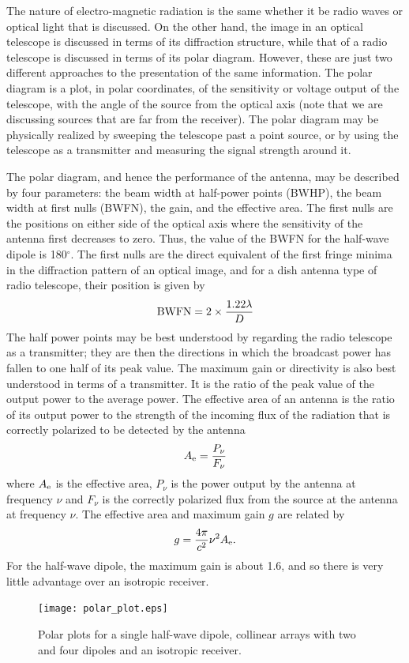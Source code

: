 The nature of electro-magnetic radiation is the same whether it be radio waves
or optical light that is discussed. On the other hand, the image in an optical 
telescope is discussed in terms of its diffraction structure, while that of 
a radio telescope is discussed in terms of its polar diagram. However, these 
are just two different approaches to the presentation of the same information.
The polar diagram is a plot, in polar coordinates, of the sensitivity or 
voltage output of the telescope, with the angle of the source from the
optical axis (note that we are discussing sources that are far from the 
receiver). The polar diagram may be physically realized by sweeping the 
telescope past a point source, or by using the telescope as a transmitter
and measuring the signal strength around it.

The polar diagram, and hence the performance of the antenna, may be described
by four parameters: the beam width at half-power points (BWHP), the 
beam width at first nulls (BWFN), the gain, and the effective area. The first
nulls are the positions on either side of the optical axis where the 
sensitivity of the antenna first decreases to zero. Thus, the value of the 
BWFN for the half-wave dipole is 180$^{\circ}$. The first nulls are the direct 
equivalent of the first fringe minima in the diffraction pattern of an optical
image, and for a dish antenna type of radio telescope, their position is given
by 
\[
{\rm BWFN}=2\times{1.22\lambda\over D}
\]
The half power points may be best understood by regarding the radio telescope
as a transmitter; they are then the directions in which the broadcast power
has fallen to one half of its peak value. The maximum gain or directivity
is also best understood in terms of a transmitter. It is the ratio of the 
peak value of the output power to the average power. The effective area of 
an antenna is the ratio of its output power to the strength of the incoming
flux of the radiation that is correctly polarized to be detected by the antenna
\[
A_{\rm e}={P_\nu\over F_\nu}
\]
where $A_{\rm e}$ is the effective area, $P_\nu$ is the power output by the 
antenna at frequency $\nu$ and $F_\nu$ is the correctly polarized flux from the
source at the antenna at frequency $\nu$. The effective area and maximum gain
$g$ are related by 
\[
g={4\pi\over c^2}\nu^2A_{\rm e}.
\]
For the half-wave dipole, the maximum gain is about 1.6, and so there is very
little advantage over an isotropic receiver. 

\begin{figure}[h]
  \centering
	\texttt{[image: polar\_plot.eps]}
  \caption{Polar plots for a single half-wave dipole, collinear arrays with two and four 
dipoles and an isotropic receiver.}
  \label{fig:polar_plot}
\end{figure}

